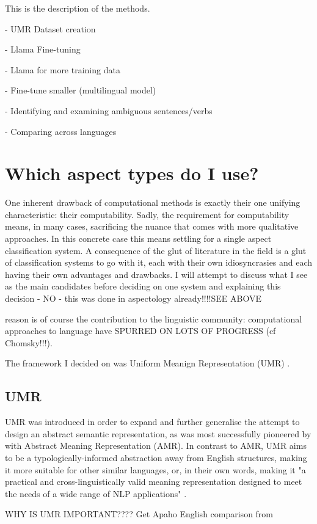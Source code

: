 This is the description of the methods. 

- UMR Dataset creation

- Llama Fine-tuning

- Llama for more training data

- Fine-tune smaller (multilingual model)

- Identifying and examining ambiguous sentences/verbs

- Comparing across languages

\section{Which aspect types do I use?}
One inherent drawback of computational methods is exactly their one unifying characteristic: their computability. Sadly, the requirement for computability means, in many cases, sacrificing the nuance that comes with more qualitative approaches. In this concrete case this means settling for a single aspect classification system. A consequence of the glut of literature in the field is a glut of classification systems to go with it, each with their own idiosyncrasies and each having their own advantages and drawbacks. I will attempt to discuss what I see as the main candidates before deciding on one system and explaining this decision - NO - this was done in aspectology already!!!!SEE ABOVE

reason is of course the contribution to the linguistic community: computational approaches to language have SPURRED ON LOTS OF PROGRESS (cf Chomsky!!!). 

The framework I decided on was Uniform Meanign Representation (UMR) \citep{umr}.

\subsection{UMR}
UMR \citep{umr} was introduced in order to expand and further generalise the attempt to design an abstract semantic representation, as was most successfully pioneered by \citet{amr} with Abstract Meaning Representation (AMR). In contrast to AMR, UMR aims to be a typologically-informed abstraction away from English structures, making it more suitable for other similar languages, or, in their own words, making it "a practical and cross-linguistically valid meaning representation designed to meet the needs of a wide range of NLP applications" \citep{umr}.

WHY IS UMR IMPORTANT???? Get Apaho English comparison from \citet{bonn-etal-2023-mapping}

